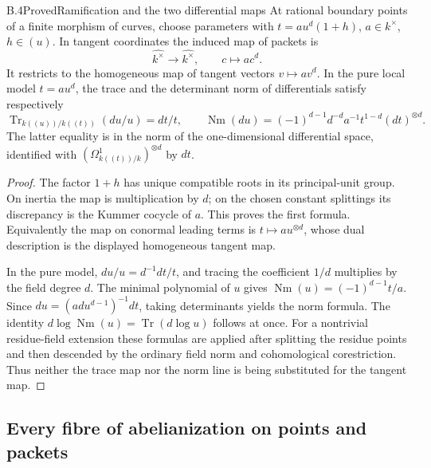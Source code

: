 \begin{statement}{B.4}{Proved}{Ramification and the two differential maps}
At rational boundary points of a finite morphism of curves, choose
parameters with
$t=a u^d(1+h)$, $a\in k^\times$, $h\in(u)$.
In tangent coordinates the induced map of packets is
\[
 \widehat{k^\times}\longrightarrow\widehat{k^\times},
 \qquad c\longmapsto a c^d.
\]
It restricts to the homogeneous map of tangent vectors
$v\mapsto a v^d$.  In the pure local model $t=a u^d$, the trace and
the determinant norm of differentials satisfy respectively
\[
 \operatorname{Tr}_{k((u))/k((t))}(du/u)=dt/t,
 \qquad
 \operatorname{Nm}(du)=
   (-1)^{d-1}d^{-d}a^{-1}t^{1-d}(dt)^{\otimes d}.
\]
The latter equality is in the norm of the one-dimensional differential
space, identified with $(\Omega^1_{k((t))/k})^{\otimes d}$ by $dt$.
\end{statement}
\begin{proof}
The factor $1+h$ has unique compatible roots in its principal-unit group.
On inertia the map is multiplication by $d$; on the chosen constant
splittings its discrepancy is the Kummer cocycle of $a$.  This proves
the first formula.  Equivalently the map on conormal leading terms is
$t\mapsto a u^{\otimes d}$, whose dual description is the displayed
homogeneous tangent map.

In the pure model, $du/u=d^{-1}dt/t$, and tracing the coefficient
$1/d$ multiplies by the field degree $d$.  The minimal polynomial of
$u$ gives $\operatorname{Nm}(u)=(-1)^{d-1}t/a$.  Since
$du=(ad u^{d-1})^{-1}dt$, taking determinants yields the norm formula.
The identity
$d\log\operatorname{Nm}(u)=\operatorname{Tr}(d\log u)$ follows at once.
For a nontrivial residue-field extension these formulas are applied
after splitting the residue points and then descended by the ordinary
field norm and cohomological corestriction.  Thus neither the trace
map nor the norm line is being substituted for the tangent map.
\end{proof}

\subsection{Every fibre of abelianization on points and packets}

